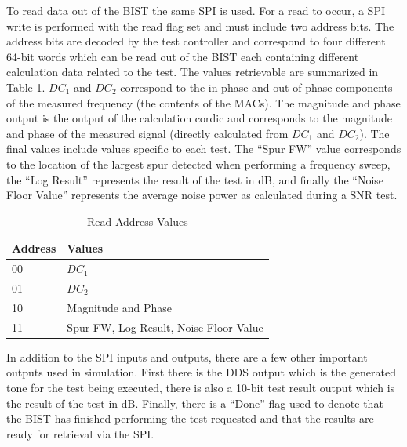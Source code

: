 \documentclass[12pt]{report}
\begin{document}
To read data out of the BIST the same SPI is used.  For a read to occur, a SPI write is performed with the read flag set and must include two address bits.  The address bits are decoded by the test controller and correspond to four different 64-bit words which can be read out of the BIST each containing different calculation data related to the test.  The values retrievable are summarized in Table \ref{tbl:readvals}.  $DC_1$ and $DC_2$ correspond to the in-phase and out-of-phase components of the measured frequency (the contents of the MACs).  The magnitude and phase output is the output of the calculation cordic and corresponds to the magnitude and phase of the measured signal (directly calculated from $DC_1$ and $DC_2$).  The final values include values specific to each test.  The ``Spur FW'' value corresponds to the location of the largest spur detected when performing a frequency sweep, the ``Log Result'' represents the result of the test in dB, and finally the ``Noise Floor Value'' represents the average noise power as calculated during a SNR test.
\begin{table}
	\caption{Read Address Values}
	\begin{center}
		\begin{tabular}{|l|l|}
			\hline
			Address & Values \\ \hline
			00 & $DC_1$ \\ \hline
			01 & $DC_2$ \\ \hline
			10 & Magnitude and Phase \\ \hline
			11 & Spur FW, Log Result, Noise Floor Value \\ \hline			
		\end{tabular}
	\end{center}
	\label{tbl:readvals}
\end{table}

In addition to the SPI inputs and outputs, there are a few other important outputs used in simulation.  First there is the DDS output which is the generated tone for the test being executed, there is also a 10-bit test result output which is the result of the test in dB.  Finally, there is a ``Done'' flag used to denote that the BIST has finished performing the test requested and that the results are ready for retrieval via the SPI.
\end{document}
